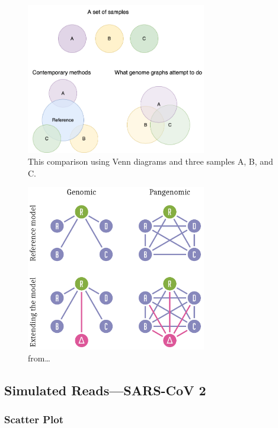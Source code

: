 \documentclass[10pt, a4paper]{article}
\begin{document}
\begin{figure}
\centering
\includegraphics[width=0.7\textwidth]{figures/All-versus-All-Comparison.png}
\caption{\label{fig:org65c808d}
This comparison using Venn diagrams and three samples A, B, and C.}
\end{figure}


\begin{figure}
\centering
\includegraphics[width=0.7\textwidth]{figures/ekg-all-vs-all.png}
\caption{\label{fig:orgf3ee47b}
from\ldots{}}
\end{figure}

\subsection{Simulated Reads—SARS-CoV 2}
\label{sec:org6c32d68}
\subsubsection{Scatter Plot}
\label{sec:org440f9eb}
\end{document}
